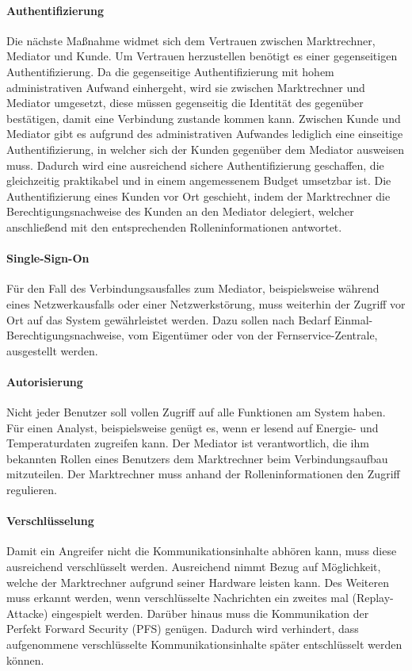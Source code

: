 \documentclass[11pt,a4paper]{report}
\begin{document}
\paragraph{Authentifizierung} 
Die nächste Maßnahme widmet sich dem Vertrauen zwischen Marktrechner, Mediator und Kunde. Um Vertrauen herzustellen benötigt es einer gegenseitigen Authentifizierung. Da die gegenseitige Authentifizierung mit hohem administrativen Aufwand einhergeht, wird sie zwischen Marktrechner und Mediator umgesetzt, diese müssen gegenseitig die Identität des gegenüber bestätigen, damit eine Verbindung zustande kommen kann. Zwischen Kunde und Mediator gibt es aufgrund des administrativen Aufwandes lediglich eine einseitige Authentifizierung, in welcher sich der Kunden gegenüber dem Mediator ausweisen muss. Dadurch wird eine ausreichend sichere Authentifizierung geschaffen, die gleichzeitig praktikabel und in einem angemessenem Budget umsetzbar ist. Die Authentifizierung eines Kunden vor Ort geschieht, indem der Marktrechner die Berechtigungsnachweise des Kunden an den Mediator delegiert, welcher anschließend mit den entsprechenden Rolleninformationen antwortet.

\paragraph{Single-Sign-On}
Für den Fall des Verbindungsausfalles zum Mediator, beispielsweise während eines Netzwerkausfalls oder einer Netzwerkstörung, muss weiterhin der Zugriff vor Ort auf das System gewährleistet werden. Dazu sollen nach Bedarf Einmal-Berechtigungsnachweise, vom Eigentümer oder von der Fernservice-Zentrale, ausgestellt werden.

\paragraph{Autorisierung}
Nicht jeder Benutzer soll vollen Zugriff auf alle Funktionen am System haben. Für einen Analyst, beispielsweise genügt es, wenn er lesend auf Energie- und Temperaturdaten zugreifen kann. Der Mediator ist verantwortlich, die ihm bekannten Rollen eines Benutzers dem Marktrechner beim Verbindungsaufbau mitzuteilen. Der Marktrechner muss anhand der Rolleninformationen den Zugriff regulieren.

\paragraph{Verschlüsselung}
Damit ein Angreifer nicht die Kommunikationsinhalte abhören kann, muss diese ausreichend verschlüsselt werden. Ausreichend nimmt Bezug auf Möglichkeit, welche der Marktrechner aufgrund seiner Hardware leisten kann. Des Weiteren muss erkannt werden, wenn verschlüsselte Nachrichten ein zweites mal (Replay-Attacke) eingespielt werden. Darüber hinaus muss die Kommunikation der Perfekt Forward Security (PFS) genügen. Dadurch wird verhindert, dass aufgenommene verschlüsselte Kommunikationsinhalte später entschlüsselt werden können.
\end{document}
